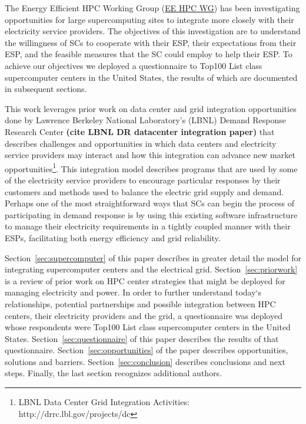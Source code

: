 The Energy Efficient HPC Working Group (\href {http://eehpcwg.lbl.gov/}{EE HPC WG})  
has been investigating opportunities for large supercomputing sites to  
integrate more closely with their electricity service providers.
The objectives of this investigation are to understand the willingness of SCs to
cooperate with their ESP, their expectations from their ESP, and the feasible measures
that the SC could employ to help their ESP.
To achieve our objectives we deployed a questionnaire to
Top100 List class supercomputer centers in the United States, the results of
which are documented in subsequent sections.

This work leverages prior work on data center and grid integration opportunities
done by Lawrence Berkeley National Laboratory's (LBNL) Demand Response 
Research Center \textbf{(cite LBNL DR datacenter integration paper)}
that describes challenges and opportunities in which data centers and electricity
service providers may interact and how this integration can advance 
new market 
opportunities\footnote{LBNL Data Center Grid Integration Activities: http://drrc.lbl.gov/projects/dc}.
This integration model describes programs that are used by some of the electricity 
service providers to encourage particular responses by their customers and methods 
used to balance the electric grid supply and demand.
Perhaps one of the most straightforward ways that SCs can begin
the process of participating in demand response is by using this existing software 
infrastructure to manage their electricity requirements in a tightly coupled manner 
with their ESPs, facilitating both energy efficiency and grid reliability.

Section~\ref{sec:supercomputer}  of this paper describes in greater detail the model for
integrating supercomputer centers and the electrical grid. Section~\ref{sec:priorwork}
is a review of prior work on HPC center strategies that might be
deployed for managing electricity and power. In order to further understand
today`s relationships, potential partnerships and possible integration
between HPC centers, their electricity providers and the grid, a
questionnaire was deployed whose respondents were Top100 List class
supercomputer centers in the United States. Section~\ref{sec:questionnaire} of this paper
describes the results of that questionnaire. Section~\ref{sec:opportunities} of the paper
describes opportunities, solutions and barriers. Section~\ref{sec:conclusion} describes
conclusions and next steps. Finally, the last section recognizes additional
authors.

